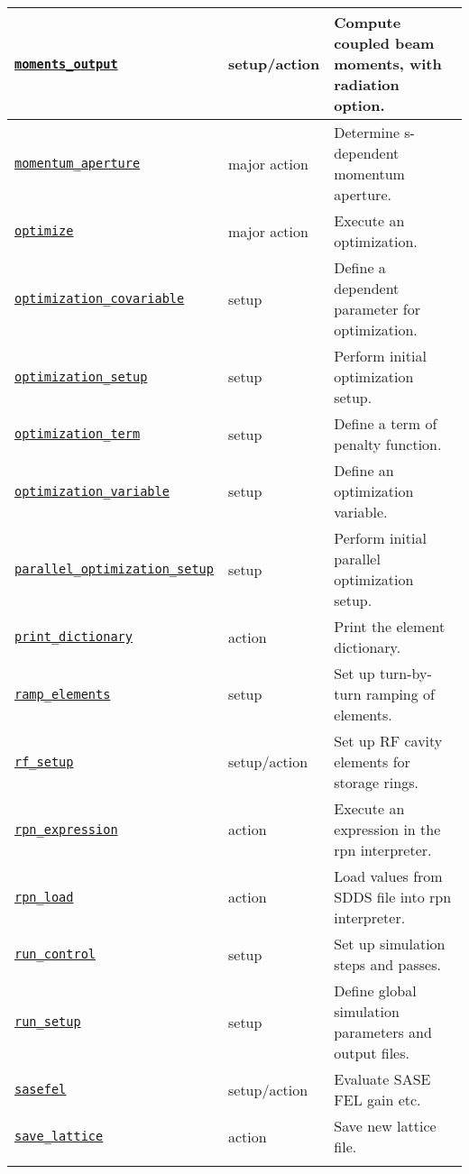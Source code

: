 \documentclass[11pt]{article}
\begin{document}
\begin{longtable}{|p{2.75in}|p{0.75in}|p{2.75in}|}
\hyperref[subsec:momentsoutput]{\tt moments\_output} & setup/action & Compute coupled beam moments, with radiation option. \\ \hline
\hyperref[subsec:momentumaperture]{\tt momentum\_aperture} & major action & Determine s-dependent momentum aperture. \\ \hline
\hyperref[subsec:optimize]{\tt optimize}}{{\tt optimize} & major action & Execute an optimization. \\ \hline
\hyperref[subsec:optimizationcovariable]{\tt optimization\_covariable} & setup & Define a dependent parameter for optimization. \\ \hline
\hyperref[subsec:optimizationsetup]{\tt optimization\_setup} & setup & Perform initial optimization setup. \\ \hline
\hyperref[subsec:optimizationterm]{\tt optimization\_term} & setup & Define a term of penalty function. \\ \hline
\hyperref[subsec:optimizationvariable]{\tt optimization\_variable} & setup & Define an optimization variable. \\ \hline
\hyperref[subsec:paralleloptimizationsetup]{\tt parallel\_optimization\_setup} & setup & Perform initial parallel optimization setup. \\ \hline
\hyperref[subsec:printdictionary]{\tt print\_dictionary} & action & Print the element dictionary. \\ \hline
\hyperref[subsec:rampelements]{\tt ramp\_elements} & setup & Set up turn-by-turn ramping of elements. \\ \hline
\hyperref[subsec:rfsetup]{\tt rf\_setup} & setup/action & Set up RF cavity elements for storage rings. \\ \hline
\hyperref[subsec:rpnexpression]{\tt rpn\_expression} & action & Execute an expression in the rpn interpreter. \\ \hline
\hyperref[subsec:rpnload]{\tt rpn\_load} & action & Load values from SDDS file into rpn interpreter. \\ \hline
\hyperref[subsec:runcontrol]{\tt run\_control} & setup & Set up simulation steps and passes. \\ \hline
\hyperref[subsec:runsetup]{\tt run\_setup} & setup & Define global simulation parameters and output files. \\ \hline
\hyperref[subsec:sasefel]{\tt sasefel} & setup/action & Evaluate SASE FEL gain etc. \\ \hline
\hyperref[subsec:savelattice]{\tt save\_lattice} & action & Save new lattice file. \\ \hline
}
\end{longtable}
\end{document}
